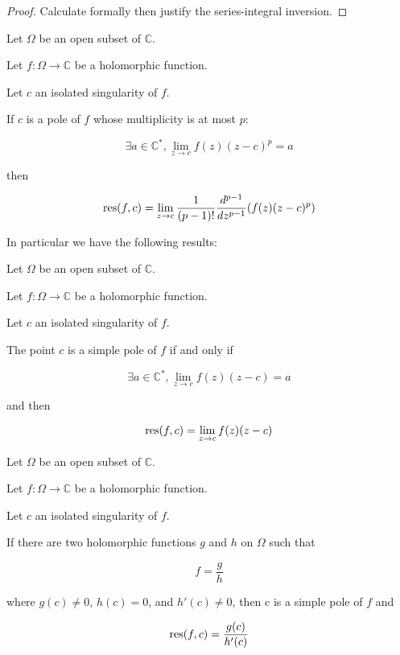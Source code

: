 \begin{proof}
    Calculate formally then justify the series-integral inversion.
\end{proof}

\begin{thm*}
    Let $\Omega$ be an open subset of $\mathbb{C}$.

    Let $f: \Omega \rightarrow \mathbb{C}$ be a holomorphic function.

    Let $c$ an isolated singularity of $f$.

    If $c$ is a pole of $f$ whose multiplicity is at most $p$:

    $$\exists a\in\mathbb{C}^*, \lim_{z\rightarrow c}f(z)(z-c)^p = a$$

    then 
    
    $$ \operatorname{res}(f, c) = \lim_{z\rightarrow c}{ \frac{1}{(p-1)!}\frac{d^{p-1}}{dz^{p-1}}(f(z)(z-c)^p) }$$
\end{thm*}


In particular we have the following results:

\begin{thm*}
    Let $\Omega$ be an open subset of $\mathbb{C}$.

    Let $f: \Omega \rightarrow \mathbb{C}$ be a holomorphic function.

    Let $c$ an isolated singularity of $f$.

    The point $c$ is a simple pole of $f$ if and only if
    
    $$\exists a\in\mathbb{C}^*, \lim_{z\rightarrow c}f(z)(z-c) = a$$

    and then
    
    $$ \operatorname{res}(f, c) = \lim_{z\rightarrow c}{f(z)(z-c)}$$
\end{thm*}

\begin{thm*}
    Let $\Omega$ be an open subset of $\mathbb{C}$.

    Let $f: \Omega \rightarrow \mathbb{C}$ be a holomorphic function.

    Let $c$ an isolated singularity of $f$.

    If there are two holomorphic functions $g$ and $h$ on $\Omega$ such that 

    $$f = \frac{g}{h}$$

    where $g(c) \neq 0$, $h(c) = 0$, and $h'(c) \neq 0$, then c is a simple pole of $f$ and 

    $$ \operatorname{res}(f, c) = \frac{g(c)}{h'(c)}$$
\end{thm*}

